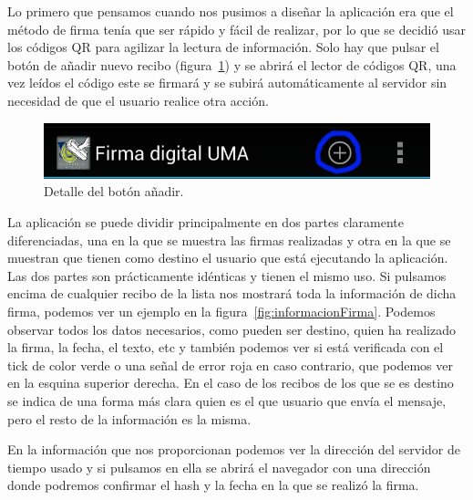 Lo primero que pensamos cuando nos pusimos a diseñar la aplicación era que el método de firma tenía que ser rápido y fácil de realizar, por lo que se decidió usar los códigos QR para agilizar la lectura de información. Solo hay que pulsar el botón de añadir nuevo recibo (figura~\ref{fig:botonAnhadir}) y se abrirá el lector de códigos QR, una vez leídos el código este se firmará y se subirá automáticamente al servidor sin necesidad de que el usuario realice otra acción.

\begin{figure}[h]
  \centering
    \includegraphics[scale=0.2]{./Android/imagenes/botonAnhadir.png}
  \caption{Detalle del botón añadir.}
  \label{fig:botonAnhadir}
\end{figure}

La aplicación se puede dividir principalmente en dos partes claramente diferenciadas, una en la que se muestra las firmas realizadas y otra en la que se muestran que tienen como destino el usuario que está ejecutando la aplicación. Las dos partes son prácticamente idénticas y tienen el mismo uso. Si pulsamos encima de cualquier recibo de la lista nos mostrará toda la información de dicha firma, podemos ver un ejemplo en la figura~\ref{fig:informacionFirma}. Podemos observar todos los datos necesarios, como pueden ser destino, quien ha realizado la firma, la fecha, el texto, etc y también podemos ver si está verificada con el tick de color verde o una señal de error roja en caso contrario, que podemos ver en la esquina superior derecha. En el caso de los recibos de los que se es destino se indica de una forma más clara quien es el que usuario que envía el mensaje, pero el resto de la información es la misma.

En la información que nos proporcionan podemos ver la dirección del servidor de tiempo usado y si pulsamos en ella se abrirá el navegador con una dirección donde podremos confirmar el hash y la fecha en la que se realizó la firma.

